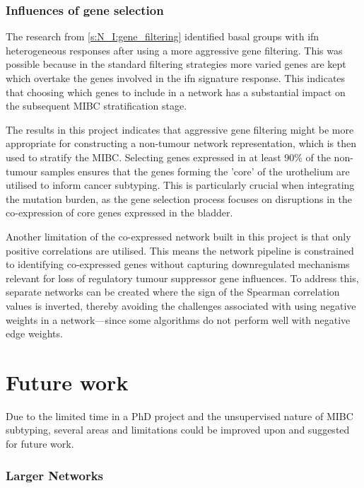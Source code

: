 \subsubsection*{Influences of gene selection}

The research from \cref{s:N_I:gene_filtering} identified basal groups with \acrshort{ifn} heterogeneous responses after using a more aggressive gene filtering. This was possible because in the standard filtering strategies more varied genes are kept which overtake the genes involved in the \acrshort{ifn} signature response. This indicates that choosing which genes to include in a network has a substantial impact on the subsequent MIBC stratification stage. 

The results in this project indicates that aggressive gene filtering might be more appropriate for constructing a non-tumour network representation, which is then used to stratify the MIBC. Selecting genes expressed in at least 90\% of the non-tumour samples ensures that the genes forming the 'core' of the urothelium are utilised to inform cancer subtyping. This is particularly crucial when integrating the mutation burden, as the gene selection process focuses on disruptions in the co-expression of core genes expressed in the bladder.

Another limitation of the co-expressed network built in this project is that only positive correlations are utilised. This means the network pipeline is constrained to identifying co-expressed genes without capturing downregulated mechanisms relevant for loss of regulatory tumour suppressor gene influences. To address this, separate networks can be created where the sign of the Spearman correlation values is inverted, thereby avoiding the challenges associated with using negative weights in a network—since some algorithms do not perform well with negative edge weights.


\section{Future work} \label{s:future_work}

Due to the limited time in a PhD project and the unsupervised nature of MIBC subtyping, several areas and limitations could be improved upon and suggested for future work.

\subsubsection*{Larger Networks}


